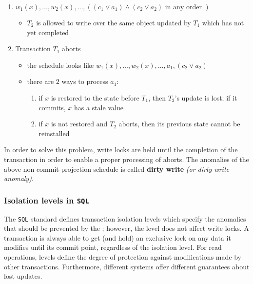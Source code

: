 \documentclass[english]{article}
\begin{document}
\begin{enumerate}
  \item \(w_1(x), \ldots, w_2(x), \ldots, \left( \left( c_1 \lor a_1 \right) \land \left( c_2 \lor a_2 \right) \text{ in any order }\right)\)
        \begin{itemize}[label=\(\rightarrow\)]
          \item \(T_2\) is allowed to write over the same object updated by \(T_1\) which has not yet completed
        \end{itemize}
  \item Transaction \(T_1\) aborts
        \begin{itemize}
          \item the schedule looks like \(w_1(x), \ldots, w_2(x), \ldots, a_1, \left( c_2 \lor a_2 \right)\)
          \item there are \(2\) ways to process \(a_1\):
                \begin{enumerate}[label=\arabic*.]
                  \item if \(x\) is restored to the state before \(T_1\), then \(T_2\)'s update is lost; if it commits, \(x\) has a stale value
                  \item if \(x\) is not restored and \(T_2\) aborts, then its previous state cannot be reinstalled
                \end{enumerate}
        \end{itemize}
\end{enumerate}

In order to solve this problem, write locks are held until the completion of the transaction in order to enable a proper processing of aborts.
The anomalies of the above non commit-projection schedule is called \textbf{dirty write} \textit{(or dirty write anomaly)}.

\subsubsection{Isolation levels in \texttt{SQL}}

The \texttt{SQL} standard defines transaction isolation levels which specify the anomalies that should be prevented by the \DBMS;
however, the level does not affect write locks.
A transaction is always able to get (and hold) an exclusive lock on any data it modifies until its commit point, regardless of the isolation level.
For read operations, levels define the degree of protection against modifications made by other transactions.
Furthermore, different systems offer different guarantees about lost updates.
\end{document}
